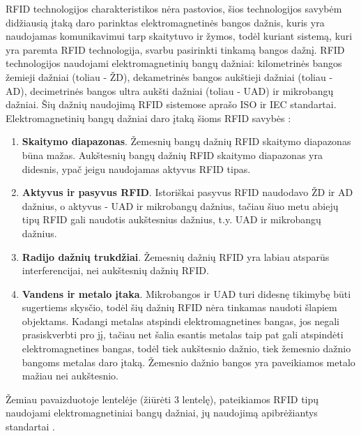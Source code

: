 RFID technologijos charakteristikos nėra pastovios, šios technologijos savybėm didžiausią įtaką daro parinktas elektromagnetinės bangos dažnis, kuris yra naudojamas komunikavimui tarp skaitytuvo ir žymos, todėl kuriant sistemą, kuri yra paremta RFID technologija, svarbu pasirinkti tinkamą bangos dažnį. RFID technologijos naudojami elektromagnetinių bangų dažniai: kilometrinės bangos žemieji dažniai (toliau - ŽD), dekametrinės bangos aukštieji dažniai  (toliau - AD), decimetrinės bangos ultra aukšti dažniai (toliau - UAD) ir mikrobangų dažniai. Šių dažnių naudojimą RFID sistemose aprašo ISO ir IEC standartai. Elektromagnetinių bangų dažniai daro įtaką šioms RFID savybės \cite{Hunt2006}:
\begin{enumerate}
    \item \textbf{Skaitymo diapazonas}. Žemesnių bangų dažnių RFID skaitymo diapazonas būna mažas. Aukštesnių bangų dažnių RFID skaitymo diapazonas yra didesnis, ypač jeigu naudojamas aktyvus RFID tipas.
    \item \textbf{Aktyvus ir pasyvus RFID}. Istoriškai pasyvus RFID naudodavo ŽD ir AD dažnius, o aktyvus - UAD ir mikrobangų dažnius, tačiau šiuo metu abiejų tipų RFID gali naudotis aukštesnius dažnius, t.y. UAD ir mikrobangų dažnius.
    \item \textbf{Radijo dažnių trukdžiai}. Žemesnių dažnių RFID yra labiau atsparūs interferencijai, nei aukštesnių dažnių RFID.
    \item \textbf{Vandens ir metalo įtaka}. Mikrobangos ir UAD turi didesnę tikimybę būti sugertiems skysčio, todėl šių dažnių RFID nėra tinkamas naudoti šlapiem objektams. Kadangi metalas atspindi elektromagnetines bangas, jos negali prasiskverbti pro jį, tačiau net šalia esantis metalas taip pat gali atspindėti elektromagnetines bangas, todėl tiek aukštesnio dažnio, tiek žemesnio dažnio bangoms metalas daro įtaką. Žemesnio dažnio bangos yra paveikiamos metalo mažiau nei aukštesnio.
\end{enumerate}
Žemiau pavaizduotoje lentelėje (žiūrėti 3 lentelę), pateikiamos RFID tipų naudojami elektromagnetiniai bangų dažniai, jų naudojimą apibrėžiantys standartai \cite{Caglar2016}.

